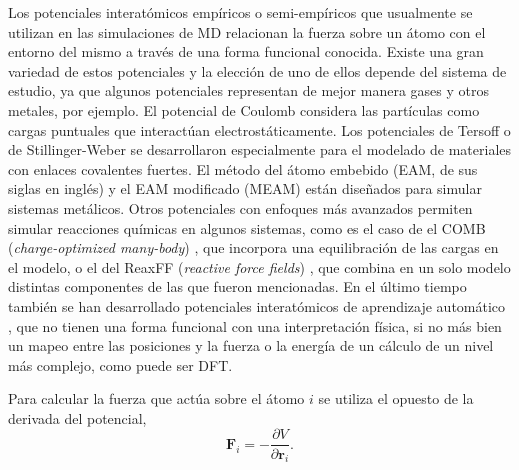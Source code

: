 Los potenciales interatómicos empíricos o semi-empíricos que usualmente se 
utilizan en las simulaciones de MD relacionan la fuerza sobre un átomo con el 
entorno del mismo a través de una forma funcional conocida. Existe una gran 
variedad de estos potenciales y la elección de uno de ellos depende del sistema 
de estudio, ya que algunos potenciales representan de mejor manera gases y otros 
metales, por ejemplo. El potencial de Coulomb \cite{coulomb} considera las 
partículas como cargas puntuales que interactúan electrostáticamente. Los 
potenciales de Tersoff \cite{tersoff} o de Stillinger-Weber 
\cite{stillinger-weber} se desarrollaron especialmente para el modelado de 
materiales con enlaces covalentes fuertes. %
El método del átomo embebido (EAM, de sus siglas en inglés) \cite{eam} 
y el EAM modificado (MEAM) \cite{meam} están diseñados para simular sistemas 
metálicos. Otros potenciales con enfoques más avanzados permiten simular
reacciones químicas en algunos sistemas, como es el caso de el COMB 
(\textit{charge-optimized many-body}) \cite{comb}, que incorpora una 
equilibración de las cargas en el modelo, o el del ReaxFF (\textit{reactive 
force fields}) \cite{reaxff}, que combina en un solo modelo distintas 
componentes de las que fueron mencionadas. En el último tiempo también se han 
desarrollado potenciales interatómicos de aprendizaje automático 
\cite{behler2016, behler2017, deringer2019}, que no tienen una forma funcional con
una interpretación física, si no más bien un mapeo entre las posiciones y la 
fuerza o la energía de un cálculo de un nivel más complejo, como puede ser DFT.

Para calcular la fuerza que actúa sobre el átomo $i$ se utiliza el opuesto 
de la derivada del potencial,
\begin{equation}\label{eq:fuerzas}
    \mathbf{F}_i = - \frac{\partial V}{\partial \mathbf{r}_i}.
\end{equation}

